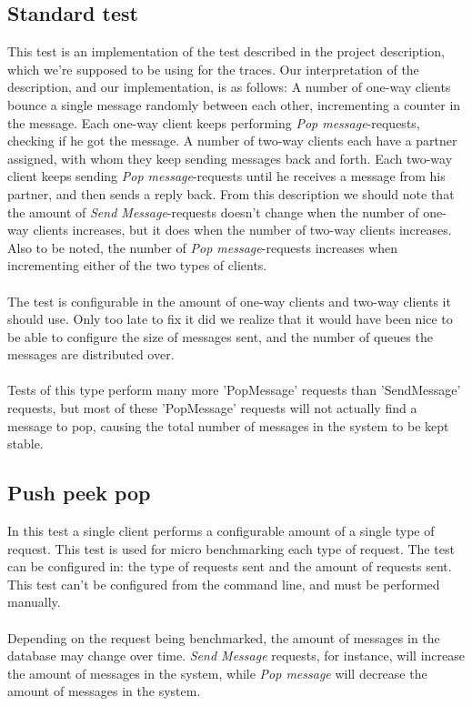 \documentclass{article}
\begin{document}
        \subsection{Standard test}
            \label{sec:standard_test}
            This test is an implementation of the test described in the project description, which we're supposed to be using for the traces. Our interpretation of the description, and our implementation, is as follows: A number of one-way clients bounce a single message randomly between each other, incrementing a counter in the message. Each one-way client keeps performing \textit{Pop message}-requests, checking if he got the message. A number of two-way clients each have a partner assigned, with whom they keep sending messages back and forth. Each two-way client keeps sending \textit{Pop message}-requests until he receives a message from his partner, and then sends a reply back. From this description we should note that the amount of \textit{Send Message}-requests doesn't change when the number of one-way clients increases, but it does when the number of two-way clients increases. Also to be noted, the number of \textit{Pop message}-requests increases when incrementing either of the two types of clients.\\
            \\
            The test is configurable in the amount of one-way clients and two-way clients it should use. Only too late to fix it did we realize that it would have been nice to be able to configure the size of messages sent, and the number of queues the messages are distributed over.\\
            \\
            Tests of this type perform many more 'PopMessage' requests than 'SendMessage' requests, but most of these 'PopMessage' requests will not actually find a message to pop, causing the total number of messages in the system to be kept stable.

        \subsection{Push peek pop}
            In this test a single client performs a configurable amount of a single type of request. This test is used for micro benchmarking each type of request.
            The test can be configured in: the type of requests sent and the amount of requests sent. This test can't be configured from the command line, and must be performed manually.\\
            \\
            Depending on the request being benchmarked, the amount of messages in the database may change over time. \textit{Send Message} requests, for instance, will increase the amount of messages in the system, while \textit{Pop message} will decrease the amount of messages in the system.
\end{document}
